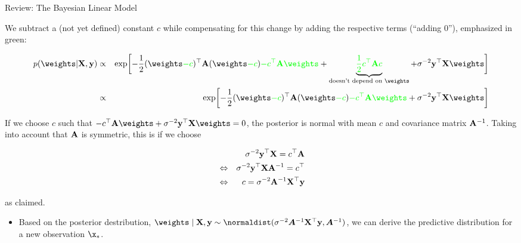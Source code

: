 \begin{frame}[c, allowframebreaks]{Review: The Bayesian Linear Model}
\begin{footnotesize}
\vspace{+.2cm}

We subtract a (not yet defined) constant $c$ while compensating for this change by adding the respective terms (``adding $0$''), emphasized in green:

\vspace{-.5cm}

\begin{eqnarray*}
	p(\thetab | \Xmat, \ydat) &\propto&  \exp\biggl[-\frac{1}{2}(\thetab \textcolor{green}{- c})^\top\Amat  (\thetab \textcolor{green}{- c}) \textcolor{green}{- c^\top \Amat \thetab} + \underbrace{\textcolor{green}{\frac{1}{2}c^\top\Amat c}}_{\text{doesn't depend on } \thetab} +\sigma^{-2} \ydat^\top \Xmat \thetab\biggr] \\
	&\propto& \exp\biggl[-\frac{1}{2}(\thetab \textcolor{green}{- c})^\top\Amat  (\thetab \textcolor{green}{- c}) \textcolor{green}{- c^\top \Amat \thetab} +\sigma^{-2} \ydat^\top \Xmat \thetab\biggr]
\end{eqnarray*}

If we choose $c$ such that $- c^\top \Amat \thetab +\sigma^{-2} \ydat^\top \Xmat \thetab = 0$, the posterior is normal with mean $c$ and covariance matrix $\mathbf{A}^{-1}$. Taking into account that $\mathbf{A}$ is symmetric, this is if we choose

\vspace{-.5cm}

\begin{eqnarray*}
&& \sigma^{-2} \mathbf{y}^\top \mathbf{X} = c^\top\mathbf{A} \\
&\Leftrightarrow & \sigma^{-2} \mathbf{y}^\top \mathbf{X} \mathbf{A}^{-1} = c^\top \\
&\Leftrightarrow& c = \sigma^{-2} \mathbf{A}^{-1} \mathbf{X}^\top \mathbf{y}
\end{eqnarray*}

\vspace{-.3cm}

as claimed.

\end{footnotesize}

\framebreak

\begin{itemize}

\item Based on the posterior destribution, 
$\thetab \mid \Xmat, \ydat \sim \normaldist(\sigma^{-2}\bm{A}^{-1}\Xmat^\top\ydat, \bm{A}^{-1})$,
we can derive the predictive distribution for a new observation $\x_*$.


\end{itemize}
\end{frame}
